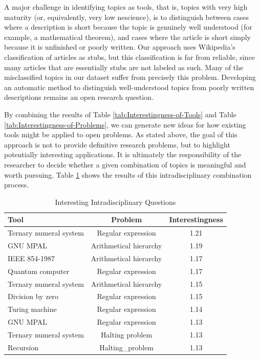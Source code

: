 A major challenge in identifying topics as tools, that is, topics with very high maturity (or, equivalently, very low nescience), is to distinguish between cases where a description is short because the topic is genuinely well understood (for example, a mathematical theorem), and cases where the article is short simply because it is unfinished or poorly written. Our approach uses Wikipedia's classification of articles as stubs, but this classification is far from reliable, since many articles that are essentially stubs are not labeled as such. Many of the misclassified topics in our dataset suffer from precisely this problem. Developing an automatic method to distinguish well-understood topics from poorly written descriptions remains an open research question.

By combining the results of Table \ref{tab:Interestingness-of-Tools}
and Table \ref{tab:Interestingness-of-Problems}, we can generate new ideas for how existing tools might be applied to open problems. As stated above, the goal of this approach is not to provide definitive research problems, but to highlight potentially interesting applications. It is ultimately the responsibility of the researcher to decide whether a given combination of topics is meaningful and worth pursuing. Table \ref{tab:Interesting-Intradisciplinary-Questions} shows the results of this intradisciplinary combination process.

\begin{table}
\begin{centering}
\begin{tabular}{|l|c|c|}
\hline 
{Tool} & Problem & Interestingness\tabularnewline
\hline 
\hline 
Ternary numeral system & Regular expression & 1.21\tabularnewline
\hline 
{GNU MPAL} & Arithmetical hierarchy & 1.19\tabularnewline
\hline 
IEEE 854-1987 & Arithmetical hierarchy & 1.17\tabularnewline
\hline 
Quantum computer & Regular expression & 1.17\tabularnewline
\hline 
Ternary numeral system & Arithmetical hierarchy & 1.15\tabularnewline
\hline 
Division by zero & Regular expression & 1.15\tabularnewline
\hline 
Turing machine & Regular expression & 1.14\tabularnewline
\hline 
GNU MPAL & Regular expression & 1.13\tabularnewline
\hline 
Ternary numeral system & Halting problem & 1.13\tabularnewline
\hline 
Recursion & Halting\_problem & 1.13\tabularnewline
\hline 
\end{tabular}
\par\end{centering}

\caption{\label{tab:Interesting-Intradisciplinary-Questions}Interesting Intradisciplinary
Questions}
\end{table}

